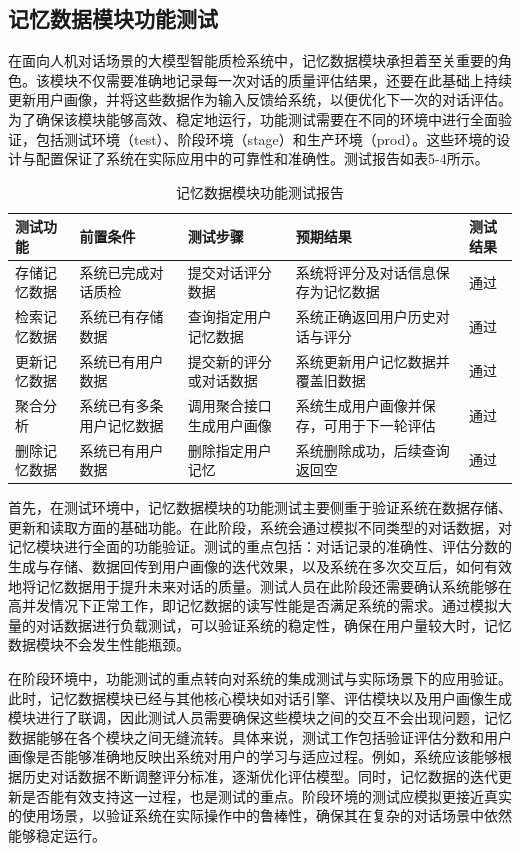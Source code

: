 \subsection{记忆数据模块功能测试}
在面向人机对话场景的大模型智能质检系统中，记忆数据模块承担着至关重要的角色。该模块不仅需要准确地记录每一次对话的质量评估结果，还要在此基础上持续更新用户画像，并将这些数据作为输入反馈给系统，以便优化下一次的对话评估。为了确保该模块能够高效、稳定地运行，功能测试需要在不同的环境中进行全面验证，包括测试环境（test）、阶段环境（stage）和生产环境（prod）。这些环境的设计与配置保证了系统在实际应用中的可靠性和准确性。测试报告如表5-4所示。
\begin{table}[htb]
\centering
\caption{记忆数据模块功能测试报告}
\label{tab:memory-task-test}
{\renewcommand{\arraystretch}{1.2}
\begin{tabular}{p{3cm} p{2cm} p{2cm} p{3cm} p{2cm}}
\hline
测试功能 & 前置条件 & 测试步骤 & 预期结果 & 测试结果 \\
\hline
存储记忆数据 & 系统已完成对话质检 & 提交对话评分数据 & 系统将评分及对话信息保存为记忆数据 & 通过 \\\hline
检索记忆数据 & 系统已有存储数据 & 查询指定用户记忆数据 & 系统正确返回用户历史对话与评分 & 通过 \\\hline
更新记忆数据 & 系统已有用户数据 & 提交新的评分或对话数据 & 系统更新用户记忆数据并覆盖旧数据 & 通过 \\\hline
聚合分析 & 系统已有多条用户记忆数据 & 调用聚合接口生成用户画像 & 系统生成用户画像并保存，可用于下一轮评估 & 通过 \\\hline
删除记忆数据 & 系统已有用户数据 & 删除指定用户记忆 & 系统删除成功，后续查询返回空 & 通过 \\
\hline
\end{tabular}}
\end{table}

首先，在测试环境中，记忆数据模块的功能测试主要侧重于验证系统在数据存储、更新和读取方面的基础功能。在此阶段，系统会通过模拟不同类型的对话数据，对记忆模块进行全面的功能验证。测试的重点包括：对话记录的准确性、评估分数的生成与存储、数据回传到用户画像的迭代效果，以及系统在多次交互后，如何有效地将记忆数据用于提升未来对话的质量。测试人员在此阶段还需要确认系统能够在高并发情况下正常工作，即记忆数据的读写性能是否满足系统的需求。通过模拟大量的对话数据进行负载测试，可以验证系统的稳定性，确保在用户量较大时，记忆数据模块不会发生性能瓶颈。

在阶段环境中，功能测试的重点转向对系统的集成测试与实际场景下的应用验证。此时，记忆数据模块已经与其他核心模块如对话引擎、评估模块以及用户画像生成模块进行了联调，因此测试人员需要确保这些模块之间的交互不会出现问题，记忆数据能够在各个模块之间无缝流转。具体来说，测试工作包括验证评估分数和用户画像是否能够准确地反映出系统对用户的学习与适应过程。例如，系统应该能够根据历史对话数据不断调整评分标准，逐渐优化评估模型。同时，记忆数据的迭代更新是否能有效支持这一过程，也是测试的重点。阶段环境的测试应模拟更接近真实的使用场景，以验证系统在实际操作中的鲁棒性，确保其在复杂的对话场景中依然能够稳定运行。

